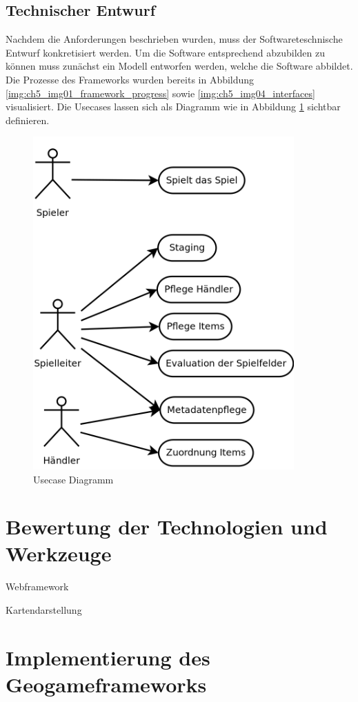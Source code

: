 

\subsection*{Technischer Entwurf}

Nachdem die Anforderungen beschrieben wurden, muss der Softwareteschnische Entwurf konkretisiert werden.
Um die Software entsprechend abzubilden zu können muss zunächst ein Modell entworfen werden, welche die Software abbildet. Die Prozesse des Frameworks wurden bereits in Abbildung \ref{img:ch5_img01_framework_progress} sowie \ref{img:ch5_img04_interfaces} visualisiert.
Die Usecases lassen sich als Diagramm wie in Abbildung \ref{img:ch5_img06_usecases} sichtbar definieren.


\begin{figure}[H]
\begin{center}
\includegraphics[width=100mm]{images/ch5_img06_usecases.png}
\caption{Usecase Diagramm}
\label{img:ch5_img06_usecases}
\end{center}
\end{figure}




\section{Bewertung der Technologien und Werkzeuge}

Webframework

Kartendarstellung

\section{Implementierung des Geogameframeworks}